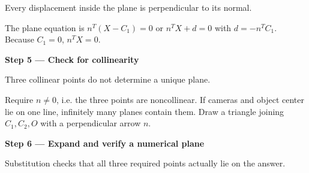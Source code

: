 \documentclass[letterpaper,11pt,english,openany,oneside]{jupyterBook}
\begin{document}
\sphinxAtStartPar
{} Every displacement inside the plane is perpendicular to its normal.

\sphinxAtStartPar
The plane equation is {\color{QuizMathBlue} \(n^T(X-C_1)=0\)} or {\color{QuizMathBlue} \(n^TX+d=0\)} with {\color{QuizMathBlue} \(d=-n^TC_1\)}. Because {\color{QuizMathBlue} \(C_1=0\)}, {\color{QuizMathBlue} \(\boxed{n^TX=0}\)}.

\par

\par\medskip{}
{\color{QuizStepRed}\bfseries Step 5 — Check for collinearity}\par\smallskip

\sphinxAtStartPar
{} Three collinear points do not determine a unique plane.

\sphinxAtStartPar
Require {\color{QuizMathBlue} \(n\ne0\)}, i.e. the three points are noncollinear. If cameras and object center lie on one line, infinitely many planes contain them. Draw a triangle joining {\color{QuizMathBlue} \(C_1,C_2,O\)} with a perpendicular arrow {\color{QuizMathBlue} \(n\)}.

\par

\par\medskip{}
{\color{QuizStepRed}\bfseries Step 6 — Expand and verify a numerical plane}\par\smallskip

\sphinxAtStartPar
{} Substitution checks that all three required points actually lie on the answer.
\end{document}
